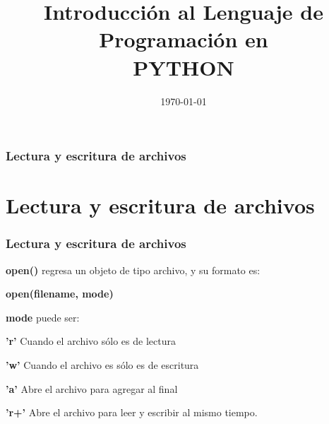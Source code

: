 \documentclass{beamer}
\title[CLASE-1]{Introducci\'on al Lenguaje de Programaci\'on en \\
PYTHON \\
{\small \subtitulo}} %
\author[santosg572@gmail.com]{\nombre} %
\institute[\iniciales] %
{
Depto. \depto \\ 
\instituto \\ %
\medskip
\textit{\correo} %
}
\date{\today} %
\begin{document}
\begin{frame}
\titlepage %
\end{frame}

\begin{frame}
\frametitle{Lectura y escritura de archivos} %
\tableofcontents %
\end{frame}


\section{Lectura y escritura de archivos} %

\begin{frame}
\frametitle{Lectura y escritura de archivos}

\textbf{open()} regresa un objeto de tipo archivo, y su formato es:

\begin{center}
\textbf{open(filename, mode)}
\end{center}

\textbf{mode} puede ser:

\hfill

\textbf{'r'}  Cuando el archivo s\'olo es de lectura

\textbf{'w'} Cuando el archivo es s\'olo es de escritura

\textbf{'a'} Abre el archivo para agregar al final

\textbf{'r+'} Abre el archivo para leer y escribir al mismo tiempo. 

\end{frame}
\end{document}
